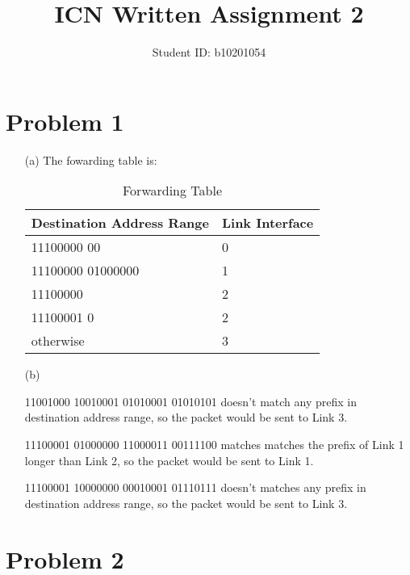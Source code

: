 \documentclass[12pt,a4paper]{article}
\title{ICN Written Assignment 2}
\author{Student ID: b10201054}
\begin{document}
\maketitle

\section*{Problem 1}

\begin{enumerate}
    \item [(a)] 
        The fowarding table is:
        \begin{table}[!ht]
            \centering
            \begin{tabular}{|l|l|}
            \hline
                Destination Address Range & Link Interface \\ \hline
                11100000 00 & 0 \\ \hline
                11100000 01000000 & 1 \\ \hline
                11100000  & 2 \\ \hline
                11100001 0 & 2 \\ \hline
                otherwise & 3 \\ \hline
            \end{tabular}
            \caption{Forwarding Table}
        \end{table}
        
    \item[(b)]
        
        11001000 10010001 01010001 01010101 doesn't match any prefix in destination address range, so the packet would be sent to Link 3.

        11100001 01000000 11000011 00111100 matches matches the prefix of Link 1 longer than Link 2, so the packet would be sent to Link 1.

        11100001 10000000 00010001 01110111 doesn't matches any prefix in destination address range, so the packet would be sent to Link 3.
        
\end{enumerate}

\section*{Problem 2}    
\end{document}
